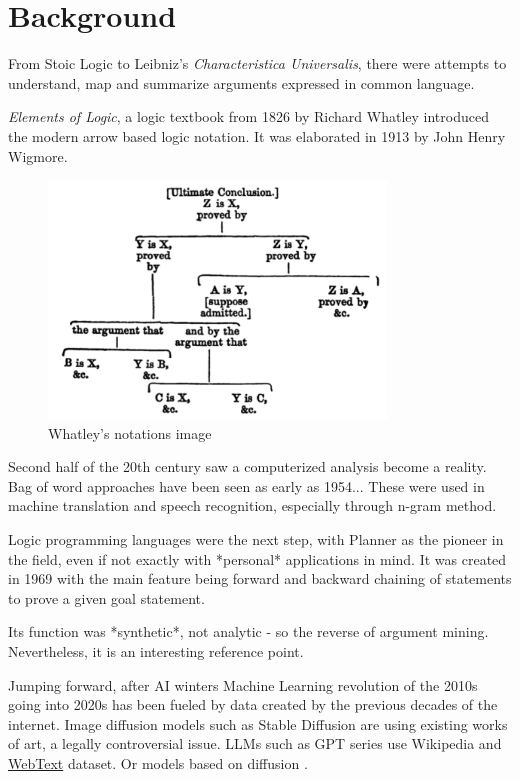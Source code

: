 \documentclass{report}
\begin{document}
\section{Background}
From Stoic Logic to Leibniz's \textit{Characteristica Universalis}, there were attempts to understand, map and summarize arguments expressed in common language. 

\cite{woltzenlogel_paleo_leibnizs_2016}
\textit{Elements of Logic}, a logic textbook from 1826 by Richard Whatley introduced the modern arrow based logic notation. It was elaborated in 1913 by John Henry Wigmore.
\cite{wigmore_principles_1913}

\begin{figure}[h]
    \centering
    \includegraphics[width=0.8\textwidth]{./images/Whatley.png}
    \caption{Whatley's notations image}
\end{figure}


Second half of the 20th century saw a computerized analysis become a reality. Bag of word approaches have been seen as early as 1954... \cite{harris_distributional_1954}
These were used in machine translation and speech recognition, especially through n-gram method. \cite{r_costa-jussa_analysis_2007}

Logic programming languages were the next step, with Planner \cite{hewitt_planner_1970} as the pioneer in the field, even if not exactly with *personal* applications in mind.  It was created in 1969 with the main feature being forward and backward chaining of statements to prove a given goal statement.

Its function was *synthetic*, not analytic - so the reverse of argument mining. Nevertheless, it is an interesting reference point.

Jumping forward, after AI winters Machine Learning revolution of the 2010s going into 2020s has been fueled by data created by the previous decades of the internet. Image diffusion models such as Stable Diffusion are using existing works of art, a legally controversial issue. LLMs such as GPT series use Wikipedia and \href{https:\\paperswithcode.com/dataset/webtext}{WebText} dataset.
Or models based on diffusion \cite{rombach_high-resolution_2022}.
\end{document}
